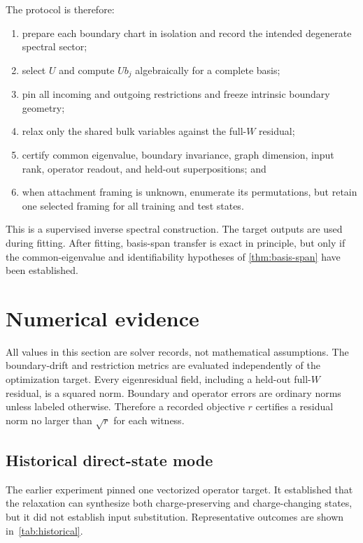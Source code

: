 \documentclass[11pt]{article}
\numberwithin{equation}{section}
\theoremstyle{definition}
\theoremstyle{remark}
\begin{document}
The protocol is therefore:

\begin{enumerate}[leftmargin=2.2em]
  \item prepare each boundary chart in isolation and record the intended
  degenerate spectral sector;
  \item select $U$ and compute $Ub_j$ algebraically for a complete basis;
  \item pin all incoming and outgoing restrictions and freeze intrinsic
  boundary geometry;
  \item relax only the shared bulk variables against the full-$W$ residual;
  \item certify common eigenvalue, boundary invariance, graph dimension, input
  rank, operator readout, and held-out superpositions; and
  \item when attachment framing is unknown, enumerate its permutations, but
  retain one selected framing for all training and test states.
\end{enumerate}

This is a supervised inverse spectral construction.  The target outputs are
used during fitting.  After fitting, basis-span transfer is exact in principle,
but only if the common-eigenvalue and identifiability hypotheses of
\cref{thm:basis-span} have been established.

\section{Numerical evidence}
\label{sec:numerics}

All values in this section are solver records, not mathematical assumptions.
The boundary-drift and restriction metrics are evaluated independently of the
optimization target.  Every eigenresidual field, including a held-out full-$W$
residual, is a squared norm.  Boundary and operator errors are ordinary norms
unless labeled otherwise.  Therefore a recorded objective $r$ certifies a
residual norm no larger than $\sqrt r$ for each witness.

\subsection{Historical direct-state mode}

The earlier experiment pinned one vectorized operator target.  It established
that the relaxation can synthesize both charge-preserving and charge-changing
states, but it did not establish input substitution.  Representative outcomes
are shown in~\cref{tab:historical}.
\end{document}
